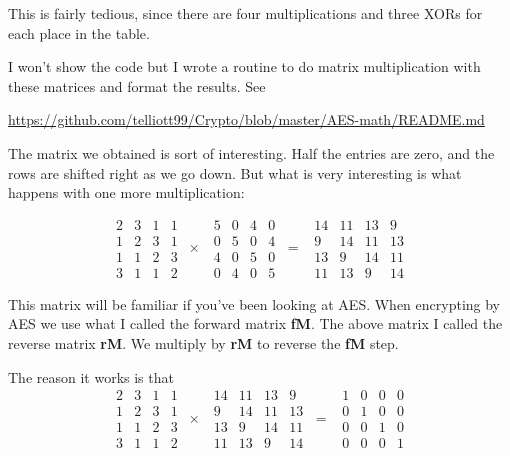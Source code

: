 \documentclass[11pt, oneside]{article}
\begin{document}
This is fairly tedious, since there are four multiplications and three XORs for each place in the table.

I won't show the code but I wrote a routine to do matrix multiplication with these matrices and format the results.  See

\url{https://github.com/telliott99/Crypto/blob/master/AES-math/README.md}

The matrix we obtained is sort of interesting.  Half the entries are zero, and the rows are shifted right as we go down.  But what is very interesting is what happens with one more multiplication:

\[  
\begin{matrix}
2 & 3 & 1 & 1 \\
1 & 2 & 3 & 1 \\
1 & 1 & 2 & 3 \\
3 & 1 & 1 & 2
\end{matrix}
\ \times \ \
\begin{matrix}
5 & 0 & 4 & 0 \\
0 & 5 & 0 & 4 \\
4 & 0 & 5 & 0 \\
0 & 4 & 0 & 5
\end{matrix}
\ = \ \ 
\begin{matrix}
14 & 11 & 13 & 9 \\
9 & 14 & 11& 13 \\
13 & 9 & 14 & 11 \\
11 & 13 & 9 & 14
\end{matrix}
\]

This matrix will be familiar if you've been looking at AES.  When encrypting by AES we use what I called the forward matrix \textbf{fM}.  The above matrix I called the reverse matrix \textbf{rM}.  We multiply by \textbf{rM} to reverse the \textbf{fM} step.

The reason it works is that
\[  
\begin{matrix}
2 & 3 & 1 & 1 \\
1 & 2 & 3 & 1 \\
1 & 1 & 2 & 3 \\
3 & 1 & 1 & 2
\end{matrix}
\ \times \ \
\begin{matrix}
14 & 11 & 13 & 9 \\
9 & 14 & 11 & 13 \\
13 & 9 & 14 & 11 \\
11 & 13 & 9 & 14
\end{matrix}
\ = \ \ 
\begin{matrix}
1 & 0 & 0 & 0 \\
0 & 1 & 0 & 0 \\
0 & 0 & 1 & 0 \\
0 & 0 & 0 & 1
\end{matrix}
\]
\end{document}

